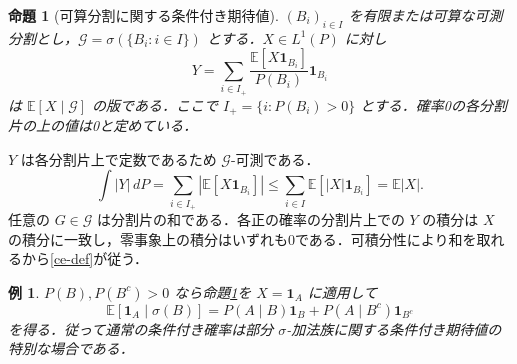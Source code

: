 \documentclass[a5paper,10pt,onecolumn]{jsarticle}
\makeatletter
\theoremstyle{mathnotetheorem}
\newtheorem{proposition}[theorem]{命題}
\newtheorem{example}[theorem]{例}
\renewcommand{\proofname}{証明}
\renewenvironment{proof}[1][\proofname]{%
  \par\pushQED{\qed}\normalfont\topsep4\p@\@plus2\p@\relax
  \trivlist\item[\hskip\labelsep\bfseries #1]\ignorespaces
}{\popQED\endtrivlist\@endpefalse}
\newcommand{\G}{\mathcal G}
\newcommand{\E}{\mathbb E}
\newcommand{\1}{\mathbf{1}}
\makeatother
\begin{document}
\begin{proposition}[可算分割に関する条件付き期待値]\label{part}
$(B_i)_{i\in I}$ を有限または可算な可測分割とし，$\G=\sigma(\{B_i:i\in I\})$ とする．$X\in L^1(P)$ に対し
\[
 Y=\sum_{i\in I_+}\frac{\E[X\1_{B_i}]}{P(B_i)}\1_{B_i}
\]
は $\E[X\mid\G]$ の版である．ここで $I_+=\{i:P(B_i)>0\}$ とする．確率0の各分割片の上の値は0と定めている．
\end{proposition}
\begin{proof}
$Y$ は各分割片上で定数であるため $\G$-可測である．
\[
 \int|Y|\,dP=\sum_{i\in I_+}|\E[X\1_{B_i}]|
 \le\sum_{i\in I}\E[|X|\1_{B_i}]=\E|X|.
\]
任意の $G\in\G$ は分割片の和である．各正の確率の分割片上での $Y$ の積分は $X$ の積分に一致し，零事象上の積分はいずれも0である．可積分性により和を取れるから\eqref{ce-def}が従う．
\end{proof}
\begin{example}
$P(B),P(B^c)>0$ なら命題\ref{part}を $X=\1_A$ に適用して
\[
 \E[\1_A\mid\sigma(B)]
 =P(A\mid B)\1_B+P(A\mid B^c)\1_{B^c}
\]
を得る．従って通常の条件付き確率は部分 $\sigma$-加法族に関する条件付き期待値の特別な場合である．
\end{example}
\end{document}
